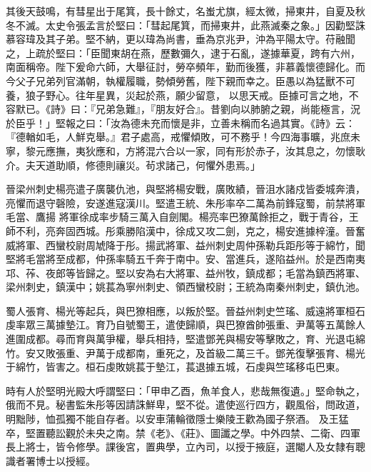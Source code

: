 \begin{pinyinscope}
 其後天鼓鳴，有彗星出于尾箕，長十餘丈，名蚩尤旗，經太微，掃東井，自夏及秋冬不滅。太史令張孟言於堅曰：「彗起尾箕，而掃東井，此燕滅秦之象。」因勸堅誅慕容瑋及其子弟。堅不納，更以瑋為尚書，垂為京兆尹，沖為平陽太守。苻融聞之，上疏於堅曰：「臣聞東胡在燕，歷數彌久，逮于石亂，遂據華夏，跨有六州，南面稱帝。陛下爰命六師，大舉征討，勞卒頻年，勤而後獲，非慕義懷德歸化。而今父子兄弟列官滿朝，執權履職，勢傾勞舊，陛下親而幸之。臣愚以為猛獸不可養，狼子野心。往年星異，災起於燕，願少留意，
 以思天戒。臣據可言之地，不容默已。《詩》曰：『兄弟急難』，『朋友好合』。昔劉向以肺腑之親，尚能極言，況於臣乎！」堅報之曰：「汝為德未充而懷是非，立善未稱而名過其實。《詩》云：『德輶如毛，人鮮克舉。』君子處高，戒懼傾敗，可不務乎！今四海事曠，兆庶未寧，黎元應撫，夷狄應和，方將混六合以一家，同有形於赤子，汝其息之，勿懷耿介。夫天道助順，修德則禳災。茍求諸己，何懼外患焉。」



 晉梁州刺史楊亮遣子廣襲仇池，與堅將楊安戰，廣敗績，晉沮水諸戍皆委城奔潰，亮懼而退守磬險，安遂進寇漢川。堅遣王統、朱彤率卒二萬為前鋒寇蜀，前禁將軍毛當、鷹揚
 將軍徐成率步騎三萬入自劍閣。楊亮率巴獠萬餘拒之，戰于青谷，王師不利，亮奔固西城。彤乘勝陷漢中，徐成又攻二劍，克之，楊安進據梓潼。晉奮威將軍、西蠻校尉周虓降于彤。揚武將軍、益州刺史周仲孫勒兵距彤等于綿竹，聞堅將毛當將至成都，仲孫率騎五千奔于南中。安、當進兵，遂陷益州。於是西南夷邛、莋、夜郎等皆歸之。堅以安為右大將軍、益州牧，鎮成都；毛當為鎮西將軍、梁州刺史，鎮漢中；姚萇為寧州刺史、領西蠻校尉；王統為南秦州刺史，鎮仇池。



 蜀人張育、楊光等起兵，與巴獠相應，以叛於堅。晉益州刺史竺瑤、威遠將軍桓石
 虔率眾三萬據墊江。育乃自號蜀王，遣使歸順，與巴獠酋帥張重、尹萬等五萬餘人進圍成都。尋而育與萬爭權，舉兵相持，堅遣鄧羌與楊安等擊敗之，育、光退屯綿竹。安又敗張重、尹萬于成都南，重死之，及首級二萬三千。鄧羌復擊張育、楊光于綿竹，皆害之。桓石虔敗姚萇于墊江，萇退據五城，石虔與竺瑤移屯巴東。



 時有人於堅明光殿大呼謂堅曰：「甲申乙酉，魚羊食人，悲哉無復遺。」堅命執之，俄而不見。秘書監朱彤等因請誅鮮卑，堅不從。遣使巡行四方，觀風俗，問政道，明黜陟，恤孤獨不能自存者。以安車蒲輪徵隱士樂陵王歡為國子祭酒。
 及王猛卒，堅置聽訟觀於未央之南。禁《老》、《莊》、圖讖之學。中外四禁、二衛、四軍長上將士，皆令修學。課後宮，置典學，立內司，以授于掖庭，選閹人及女隸有聰識者署博士以授經。




\end{pinyinscope}

